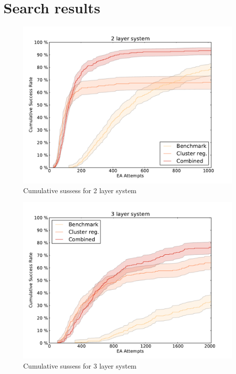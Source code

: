 \documentclass[%
 aps,
 prl,%
 amsmath,amssymb,
 reprint,%
]{revtex4-1}
\begin{document}
\section{Search results}

\begin{figure}[h]
    \centering
    \includegraphics[width=1.0\columnwidth]{2lsuccess.pdf}
    \caption{Cumulative sussess for 2 layer system}
    \label{fig:fig4}
\end{figure}


\begin{figure}[h]
    \centering
    \includegraphics[width=1.0\columnwidth]{3lsuccess.pdf}
    \caption{Cumulative sussess for 3 layer system}
    \label{fig:fig5}
\end{figure}
\end{document}
